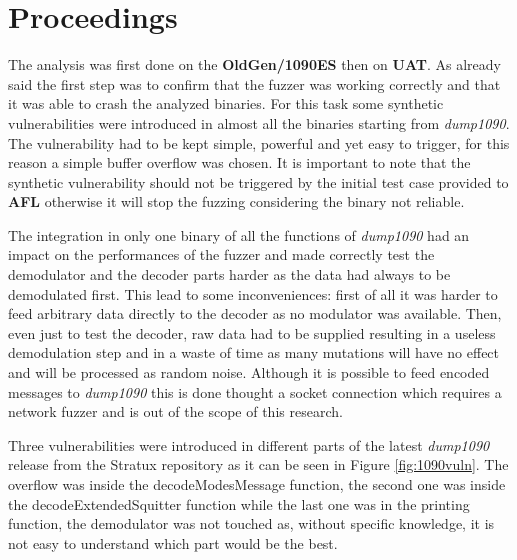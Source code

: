 \documentclass[../main.tex]{subfiles}
\begin{document}
\section{Proceedings}

The analysis was first done on the \textbf{OldGen/1090ES} then on \textbf{UAT}.
As already said the first step was to confirm that the fuzzer was working
correctly and that it was able to crash the analyzed binaries. For this task
some synthetic vulnerabilities were introduced in almost all the binaries
starting from \textit{dump1090}. The vulnerability had to be kept simple,
powerful and yet easy to trigger, for this reason a simple buffer overflow was
chosen. It is important to note that the synthetic vulnerability should not be
triggered by the initial test case provided to \textbf{AFL} otherwise it will
stop the fuzzing considering the binary not reliable.

The integration in only one binary of all the functions of \textit{dump1090} had
an impact on the performances of the fuzzer and made correctly test the
demodulator and the decoder parts harder as the data had always to be
demodulated first. This lead to some inconveniences: first of all it was harder
to feed arbitrary data directly to the decoder as no modulator was available.
Then, even just to test the decoder, raw data had to be supplied resulting in a
useless demodulation step and in a waste of time as many mutations will have no
effect and will be processed as random noise. Although it is possible to feed
encoded messages to \textit{dump1090} this is done thought a socket connection
which requires a network fuzzer and is out of the scope of this research.

Three vulnerabilities were introduced in different parts of the latest
\textit{dump1090} release from the Stratux repository as it can be seen in
Figure \ref{fig:1090vuln}. The overflow was inside the decodeModesMessage
function, the second one was inside the decodeExtendedSquitter function while
the last one was in the printing function, the demodulator was not touched as,
without specific knowledge, it is not easy to understand which part would be the
best.
\end{document}
